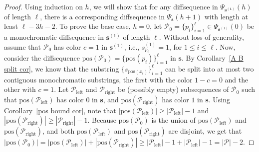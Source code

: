 \documentclass[11pt]{article}
\begin{document}
\begin{proof}
Using induction on $h$, we will show that for any diffsequence in $\Psi_{\mathbf{s^{(1)}}}(h)$ of length $\ell$, there is a corresponding diffsequence in $\Psi_{\mathbf{s}}(h+1)$ with length at least $\ell-3h-2$. To prove the base case, $h=0$, let $ \mathcal{P}_0 =\{ p_i\}_{i=1}^{\ell} \in \Psi_{\mathbf{s}^{(1)}}(0)$ be a monochromatic diffsequence in $\mathbf{s}^{(1)}$ of length $\ell$. Without loss of generality, assume that $ \mathcal{P}_0$ has color $c=1$ in $\mathbf{s}^{(1)}$, i.e., $s^{(1)}_{p_i} = 1$, for $1 \le i \le \ell$. Now, consider the diffsequence $\text{pos}(\mathcal{P}_0) = \{\text{pos}(p_i)\}_{i=1}^{\ell}$ in $\mathbf{s}$. By Corollary~\ref{A B split cor}, we know that the substring $\{s_{\text{pos}(x_i)}\}_{i=1}^{\ell}$ can be split into at most two contiguous monochromatic substrings, the first with the color $1-c=0$ and the other with $c=1$. Let $\mathcal{P}_{\text{left}}$ and $\mathcal{P}_{\text{right}}$ be (possibly empty) subsequences of $ \mathcal{P}_0$ such that $\text{pos}(\mathcal{P}_{\text{left}})$ has color $0$ in $\mathbf{s}$, and $\text{pos}(\mathcal{P}_{\text{right}})$ has color $1$ in $\mathbf{s}$. Using Corollary~\ref{pos bound cor}, note that $|\text{pos}(\mathcal{P}_{\text{left}})|\ge|\mathcal{P}_{\text{left}}|-1$ and $|\text{pos}(\mathcal{P}_{\text{right}})|\ge|\mathcal{P}_{\text{right}}|-1$. Because $\text{pos}(\mathcal{P}_0)$ is the union of $\text{pos}(\mathcal{P}_{\text{left}})$ and $\text{pos}(\mathcal{P}_{\text{right}})$, and both $\text{pos}(\mathcal{P}_{\text{left}})$ and $\text{pos}(\mathcal{P}_{\text{right}})$ are disjoint, we get that $|\text{pos}(\mathcal{P}_0)|=|\text{pos}(\mathcal{P}_{\text{left}})|+|\text{pos}(\mathcal{P}_{\text{right}})|\ge |\mathcal{P}_{\text{left}}|-1+|\mathcal{P}_{\text{left}}|-1=|\mathcal{P}|-2$.


\end{proof}
\end{document}
